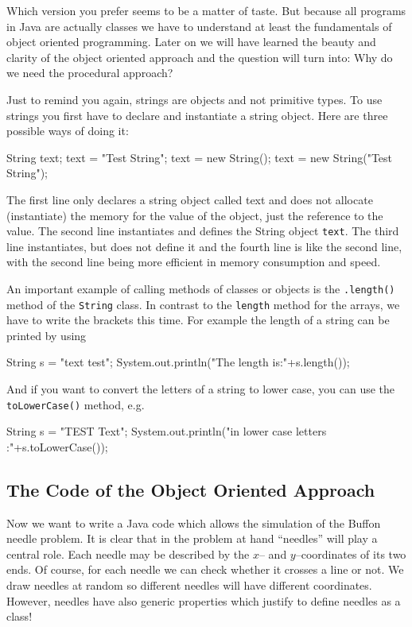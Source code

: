 Which version you prefer seems to be a matter of taste. 
But because all programs in Java are
actually classes we have to understand at least the 
fundamentals of object oriented programming. 
Later on we will have learned the beauty and clarity of the object
oriented approach and the question will turn into: Why do we need
the procedural approach?

Just to remind you again, strings are objects and not primitive 
types. To use strings you first have to declare and instantiate a string
object. Here are three possible ways of doing it:
\begin{sverbatim}
        String text;
        text = "Test String";
        text = new String();
        text = new String("Test String");
\end{sverbatim}
The first line only declares a string object called text and does not
allocate (instantiate) the memory for the value of the object, just
the reference to the value. The second line instantiates and 
defines the String object \verb|text|. The third line instantiates, but
does not define it and the fourth line is like the second line, with
the second line being more efficient in memory consumption and
speed.

An important example of calling methods of classes or objects is
the \verb|.length()| method of the \verb|String| class. In contrast
to the \verb|length| method for the arrays, we have to write the
brackets this time. For example the length of a string can
be printed by using
\begin{sverbatim}
   String s = "text test";
   System.out.println("The length is:"+s.length());
\end{sverbatim}
And if you want to convert the letters of a string to lower case,
you can use the \verb|toLowerCase()| method, e.g.
\begin{sverbatim}
   String s = "TEST Text";
   System.out.println("in lower case letters :"+s.toLowerCase());
\end{sverbatim}


\subsection{The Code of the Object Oriented Approach}
Now we want to
write a Java code which allows the simulation of the Buffon needle
problem. It is clear that in the problem at hand ``needles'' will play
a central role. Each needle may be described by the $x$-- and
$y$--coordinates of  its two ends. Of course, for each needle we can
check whether it crosses a line or not. We draw needles at random so
different needles will have different coordinates. However, needles
have also generic properties which justify to define needles as a class!

